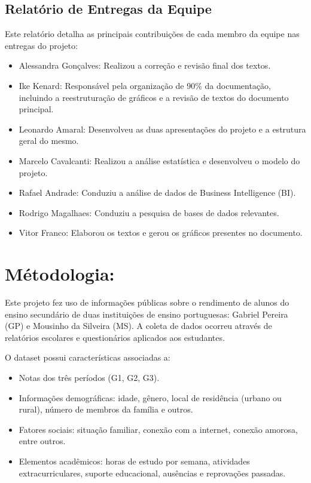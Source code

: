\documentclass[
  letterpaper,
  DIV=11,
  numbers=noendperiod,
  openany]{scrreprt}
\providecommand{\tightlist}{%
  \setlength{\itemsep}{0pt}\setlength{\parskip}{0pt}}
\begin{document}
\section{Relatório de Entregas da
Equipe}\label{relatuxf3rio-de-entregas-da-equipe}

Este relatório detalha as principais contribuições de cada membro da
equipe nas entregas do projeto:

\begin{itemize}
\tightlist
\item
  Alessandra Gonçalves: Realizou a correção e revisão final dos textos.
\item
  Ike Kenard: Responsável pela organização de 90\% da documentação,
  incluindo a reestruturação de gráficos e a revisão de textos do
  documento principal.
\item
  Leonardo Amaral: Desenvolveu as duas apresentações do projeto e a
  estrutura geral do mesmo.
\item
  Marcelo Cavalcanti: Realizou a análise estatística e desenvolveu o
  modelo do projeto.
\item
  Rafael Andrade: Conduziu a análise de dados de Business Intelligence
  (BI).
\item
  Rodrigo Magalhaes: Conduziu a pesquisa de bases de dados relevantes.
\item
  Vitor Franco: Elaborou os textos e gerou os gráficos presentes no
  documento.
\end{itemize}


\chapter{Métodologia:}\label{muxe9todologia}

Este projeto fez uso de informações públicas sobre o rendimento de
alunos do ensino secundário de duas instituições de ensino portuguesas:
Gabriel Pereira (GP) e Mousinho da Silveira (MS). A coleta de dados
ocorreu através de relatórios escolares e questionários aplicados aos
estudantes.

O dataset possui características associadas a:

\begin{itemize}
\tightlist
\item
  Notas dos três períodos (G1, G2, G3).
\item
  Informações demográficas: idade, gênero, local de residência (urbano
  ou rural), número de membros da família e outros.
\item
  Fatores sociais: situação familiar, conexão com a internet, conexão
  amorosa, entre outros.
\item
  Elementos acadêmicos: horas de estudo por semana, atividades
  extracurriculares, suporte educacional, ausências e reprovações
  passadas.
\end{itemize}
\end{document}
